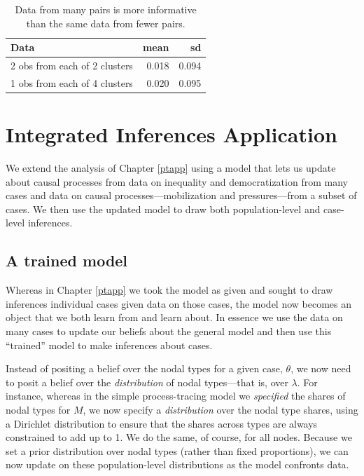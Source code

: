 \documentclass[
  12pt,
]{book}
\newenvironment{headerbox}{
  \definecolor{shadecolor}{rgb}{0.8, 0.8, 0.8}  %
  \color{black}
  \begin{shaded}}{\end{shaded}}
\begin{document}
\begin{table}

\caption{\label{tab:cluster}Data from many pairs is more informative than the same data from fewer pairs.}
\centering
\begin{tabular}[t]{l|r|r}
\hline
Data & mean & sd\\
\hline
2 obs from each of 2 clusters & 0.018 & 0.094\\
\hline
1 obs from each of 4 clusters & 0.020 & 0.095\\
\hline
\end{tabular}
\end{table}

\hypertarget{mixingapp}{%
\chapter{Integrated Inferences Application}\label{mixingapp}}

\begin{headerbox}
We extend the analysis of Chapter \ref{ptapp} using a model that lets us update about causal processes from data on inequality and democratization from many cases and data on causal processes---mobilization and pressures---from a subset of cases. We then use the updated model to draw both population-level and case-level inferences.

\end{headerbox}

\hypertarget{a-trained-model}{%
\section{A trained model}\label{a-trained-model}}

Whereas in Chapter \ref{ptapp} we took the model as given and sought to draw inferences individual cases given data on those cases, the model now becomes an object that we both learn from and learn about. In essence we use the data on many cases to update our beliefs about the general model and then use this ``trained'' model to make inferences about cases.

Instead of positing a belief over the nodal types for a given case, \(\theta\), we now need to posit a belief over the \emph{distribution} of nodal types---that is, over \(\lambda\). For instance, whereas in the simple process-tracing model we \emph{specified} the shares of nodal types for \(M\), we now specify a \emph{distribution} over the nodal type shares, using a Dirichlet distribution to ensure that the shares across types are always constrained to add up to 1. We do the same, of course, for all nodes. Because we set a prior distribution over nodal types (rather than fixed proportions), we can now update on these population-level distributions as the model confronts data.
\end{document}
